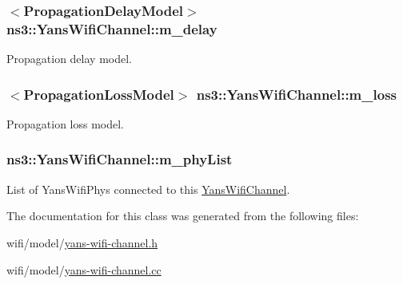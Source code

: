 \subsubsection[{\texorpdfstring{m\+\_\+delay}{m_delay}}]{$<${\bf Propagation\+Delay\+Model}$>$ ns3\+::\+Yans\+Wifi\+Channel\+::m\+\_\+delay\hspace{0.3cm}{\ttfamily [private]}}\hypertarget{classns3_1_1YansWifiChannel_a3abdf11e233502f00d96239c50f1409e}{}\label{classns3_1_1YansWifiChannel_a3abdf11e233502f00d96239c50f1409e}


Propagation delay model. 

\subsubsection[{\texorpdfstring{m\+\_\+loss}{m_loss}}]{$<${\bf Propagation\+Loss\+Model}$>$ ns3\+::\+Yans\+Wifi\+Channel\+::m\+\_\+loss\hspace{0.3cm}{\ttfamily [private]}}\hypertarget{classns3_1_1YansWifiChannel_a7ac546c96799f5b8e02179a67d074eef}{}\label{classns3_1_1YansWifiChannel_a7ac546c96799f5b8e02179a67d074eef}


Propagation loss model. 

\subsubsection[{\texorpdfstring{m\+\_\+phy\+List}{m_phyList}}]{ ns3\+::\+Yans\+Wifi\+Channel\+::m\+\_\+phy\+List\hspace{0.3cm}{\ttfamily [private]}}\hypertarget{classns3_1_1YansWifiChannel_a6a5b45c318c8039e4bb6846b0a58c2e3}{}\label{classns3_1_1YansWifiChannel_a6a5b45c318c8039e4bb6846b0a58c2e3}


List of Yans\+Wifi\+Phys connected to this \hyperlink{classns3_1_1YansWifiChannel}{Yans\+Wifi\+Channel}. 



The documentation for this class was generated from the following files\+:\begin{DoxyCompactItemize}
\item 
wifi/model/\hyperlink{yans-wifi-channel_8h}{yans-\/wifi-\/channel.\+h}\item 
wifi/model/\hyperlink{yans-wifi-channel_8cc}{yans-\/wifi-\/channel.\+cc}\end{DoxyCompactItemize}
